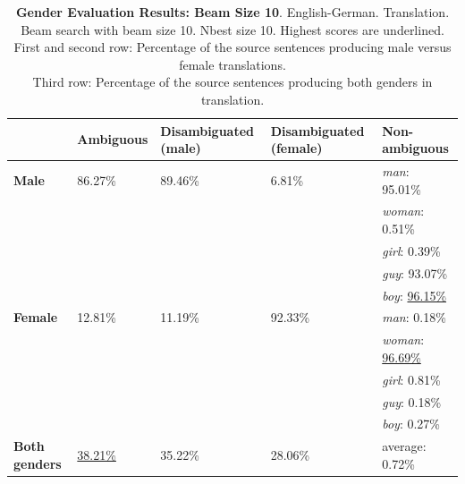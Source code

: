 \begin{table} 
    \begin{tabularx}{\linewidth}{|X|XXXX|}
        \hline
         & \textbf{Ambiguous} & \textbf{Disambiguated (male)} & \textbf{Disambiguated (female)} & \textbf{Non-ambiguous} \\ \hline
         \textbf{Male} & 86.27\% & 89.46\% & 6.81\% & \textit{man}: 95.01\% \\
         &&&& \textit{woman}: 0.51\% \\
         &&&& \textit{girl}: 0.39\% \\
         &&&& \textit{guy}: 93.07\% \\
         &&&& \textit{boy}: \underline{96.15\%} \\ \hline
         \textbf{Female} & 12.81\% & 11.19\% & 92.33\% & \textit{man}: 0.18\% \\ 
         &&&& \textit{woman}: \underline{96.69\%} \\
         &&&& \textit{girl}: 0.81\% \\
         &&&& \textit{guy}: 0.18\% \\
         &&&& \textit{boy}: 0.27\% \\\hline
         \textbf{Both genders} & \underline{38.21\%} & 35.22\% & 28.06\% & average: 0.72\% \\ \hline
    \end{tabularx}
    \caption{\textbf{Gender Evaluation Results: Beam Size 10}. English-German. Translation. Beam search with beam size 10. Nbest size 10. Highest scores are underlined. \\ First and second row: Percentage of the source sentences producing male versus female translations. \\ Third row: Percentage of the source sentences producing both genders in translation.}
    \label{tab:gender_percent_10}
\end{table}


